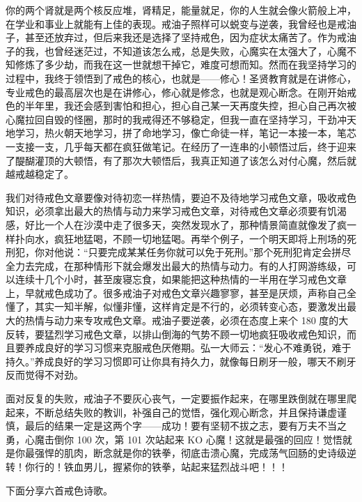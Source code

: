 你的两个肾就是两个核反应堆，肾精足，能量就足，你的人生就会像火箭般上冲，在学业和事业上就能有上佳的表现。戒油子照样可以蜕变与逆袭，我曾经也是戒油子，甚至还放弃过，但后来我还是选择了坚持戒色，因为症状太痛苦了。作为戒油子的我，也曾经迷茫过，不知道该怎么戒，总是失败，心魔实在太强大了，心魔不知修炼了多少劫，而我在这一世就想干掉它，难度可想而知。然而在我坚持学习的过程中，我终于领悟到了戒色的核心，也就是——修心！圣贤教育就是在讲修心，专业戒色的最高层次也是在讲修心，修心就是修念，也就是观心断念。在刚开始戒色的半年里，我还会感到害怕和担心，担心自己某一天再度失控，担心自己再次被心魔拉回自毁的怪圈，那时的我戒得还不够稳定，但我一直在坚持学习，干劲冲天地学习，热火朝天地学习，拼了命地学习，像亡命徒一样，笔记一本接一本，笔芯一支接一支，几乎每天都在疯狂做笔记。在经历了一连串的小顿悟过后，终于迎来了醍醐灌顶的大顿悟，有了那次大顿悟后，我真正知道了该怎么对付心魔，然后就越戒越稳定了。

我们对待戒色文章要像对待初恋一样热情，要迫不及待地学习戒色文章，吸收戒色知识，必须拿出最大的热情与动力来学习戒色文章，对待戒色文章必须要有饥渴感，好比一个人在沙漠中走了很多天，突然发现水了，那种情景简直就像发了疯一样扑向水，疯狂地猛喝，不顾一切地猛喝。再举个例子，一个明天即将上刑场的死刑犯，你对他说：“只要完成某某任务你就可以免于死刑。”那个死刑犯肯定会拼尽全力去完成，在那种情形下就会爆发出最大的热情与动力。有的人打网游练级，可以连续十几个小时，甚至废寝忘食，如果能把这种热情的一半用在学习戒色文章上，早就戒色成功了。很多戒油子对戒色文章兴趣寥寥，甚至是厌烦，声称自己全懂了，其实一知半解，似懂非懂，这样肯定是不行的，必须转变心态，要激发出最大的热情与动力来专攻戒色文章。戒油子要逆袭，必须在态度上来个 180 度的大反转，要猛烈学习戒色文章，以排山倒海的气势不顾一切地疯狂吸收戒色知识，而且要养成良好的学习习惯来克服戒色厌倦期。弘一大师云：“发心不难勇锐，难于持久。”养成良好的学习习惯即可让你具有持久力，就像每日刷牙一般，哪天不刷牙反而觉得不对劲。

面对反复的失败，戒油子不要灰心丧气，一定要振作起来，在哪里跌倒就在哪里爬起来，不断总结失败的教训，补强自己的觉悟，强化观心断念，并且保持谦虚谨慎，最后的结果一定是这两个字——成功！要有坚韧不拔之志，要有万夫不当之勇，心魔击倒你 100 次，第 101 次站起来 KO 心魔！这就是最强的回应！觉悟就是你最强悍的肌肉，断念就是你的铁拳，彻底击溃心魔，完成荡气回肠的史诗级逆转！你行的！铁血男儿，握紧你的铁拳，站起来猛烈战斗吧！！！

下面分享六首戒色诗歌。

